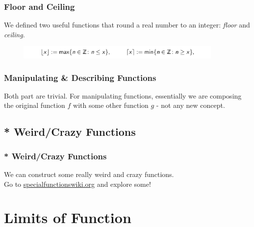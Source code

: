 \documentclass[10pt, t]{beamer}
\renewcommand{\emph}[1]{{\color{themecolor}\textsl{#1}}}
\newcommand{\nullspace}{~\\[15pt]}
\begin{document}
\begin{frame}
    \frametitle{Floor and Ceiling}

    We defined two useful functions that round a real number to an integer: \emph{floor} and \emph{ceiling}.
    \begin{figure}[H]
        \centering
        \includegraphics[width=0.9\textwidth]{2020-10-14-11-17-06.png}
    \end{figure}

\end{frame}

\begin{frame}
    \frametitle{Manipulating \& Describing Functions}

    Both part are trivial. For manipulating functions, essentially we are composing the original function $f$ with some other function $g$ - not any new concept.

\end{frame}

\subsection{* Weird/Crazy Functions}
\begin{frame}
    \frametitle{* Weird/Crazy Functions}

    We can construct some really weird and crazy functions. \nullspace

    Go to \href{http://specialfunctionswiki.org/index.php/Main_Page}{specialfunctionswiki.org} and explore some!

\end{frame}

\section{Limits of Function}
\end{document}
